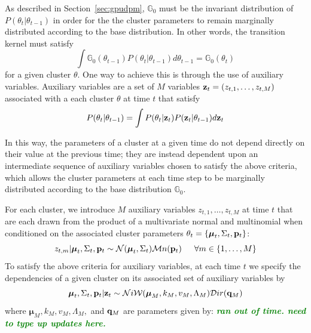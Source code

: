 \documentclass{article}
\newcommand{\willie}[1]{\textcolor{green}{\textsf{\emph{\textbf{\textcolor{green}{#1}}}}}}
\begin{document}
As described in Section~\ref{sec:gpudpm}, $\mathbb{G}_{0}$ must be the invariant distribution of $P(\theta_{t} | \theta_{t-1})$ in order for the the cluster parameters to remain marginally distributed according to the base distribution. In other words, the transition kernel must satisfy
\begin{equation}
\int \mathbb{G}_{0}(\theta_{t-1})P(\theta_{t} | \theta_{t-1}) d\theta_{t-1} = \mathbb{G}_{0}(\theta_{t})
\end{equation}
for a given cluster $\theta$. One way to achieve this is through the use of auxiliary variables. Auxiliary variables are a set of $M$ variables $\bold{z}_{t} = (z_{t,1}, \ldots, z_{t,M})$ associated with a each cluster $\theta$ at time $t$ that satisfy
\begin{eqnarray}
P(\theta_{t} | \theta_{t-1}) = \int P(\theta_{t} | \bold{z}_{t}) P(\bold{z}_{t} | \theta_{t-1}) d \bold{z}_{t}  %
\end{eqnarray}

In this way, the parameters of a cluster at a given time do not depend directly on their value at the previous time; they are instead dependent upon an intermediate sequence of auxiliary variables chosen to satisfy the above criteria, which allows the cluster parameters at each time step to be marginally distributed according to the base distribution $\mathbb{G}_{0}$.

For each cluster, we introduce $M$ auxiliary variables $z_{t, 1}, \ldots, z_{t, M}$ at time $t$ that are each drawn from the product of a multivariate normal and multinomial when conditioned on the associated cluster parameters $\theta_{t} = \{ \boldsymbol{\mu}_{t}, \Sigma_{t}, \bold{p}_{t} \}$:
\begin{equation}
z_{t, m} | \boldsymbol{\mu}_{t}, \Sigma_{t}, \bold{p}_{t}  \sim  \mathcal{N}(\boldsymbol{\mu}_{t}, \Sigma_{t}) \mathcal{M}n(\bold{p}_{t})   \hspace{15pt}   
\forall m \in \{ 1, \ldots, M \}
\end{equation}
To satisfy the above criteria for auxiliary variables, at each time $t$ we specify the dependencies of a given cluster on its associated set of auxiliary variables by
\begin{equation}
\boldsymbol{\mu}_{t}, \Sigma_{t}, \bold{p}_{t} | \bold{z}_t  \sim  \mathcal{N}i\mathcal{W}(\boldsymbol{\mu}_{M}, k_{M}, v_{M}, \Lambda_{M})  \mathcal{D}ir(\bold{q}_{M})
\end{equation}
where $\boldsymbol{\mu}_{M}, k_{M}, v_{M}, \Lambda_{M},$ and $\bold{q}_{M}$ are parameters given by:
\willie{ran out of time. need to type up updates here.}
\end{document}
